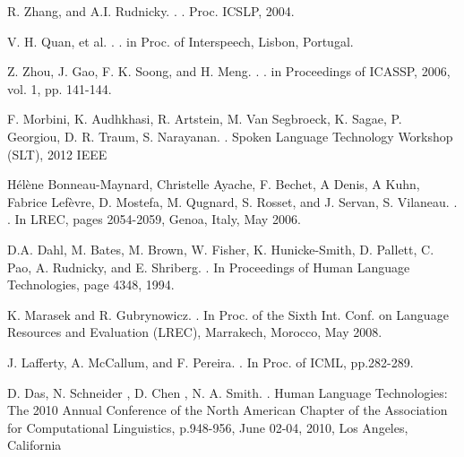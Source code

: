 \documentclass[11pt,letterpaper]{article}
\begin{document}
\begin{thebibliography}{}
R. Zhang, and A.I. Rudnicky.
. 
.
\newblock Proc. ICSLP, 2004. 

V. H. Quan, et al.
. 
.
\newblock in Proc. of Interspeech, Lisbon, Portugal.

Z. Zhou, J. Gao, F. K. Soong, and H. Meng.
. 
.
\newblock in Proceedings of ICASSP, 2006, vol. 1, pp. 141-144. 

F. Morbini, K. Audhkhasi, R. Artstein, M. Van Segbroeck, K. Sagae, P. Georgiou, D. R. Traum, S. Narayanan.
. 
\newblock Spoken Language Technology Workshop (SLT), 2012 IEEE

H\'{e}l\`{e}ne Bonneau-Maynard, Christelle Ayache, F. Bechet, A Denis, A Kuhn, Fabrice Lef\`{e}vre, D. Mostefa, M. Qugnard, S. Rosset, and J. Servan, S. Vilaneau. 
. 
.
\newblock In LREC, pages 2054-2059, Genoa, Italy, May 2006.

D.A. Dahl, M. Bates, M. Brown, W. Fisher, K. Hunicke-Smith, D. Pallett, C. Pao, A. Rudnicky, and E. Shriberg.
. 
\newblock In Proceedings of Human Language Technologies, page 4348, 1994.

K. Marasek and R. Gubrynowicz. 
. 
\newblock In Proc. of the Sixth Int. Conf. on Language Resources and Evaluation (LREC), Marrakech, Morocco, May 2008.

J. Lafferty, A. McCallum, and F. Pereira.
. 
\newblock In Proc. of ICML, pp.282-289.

D. Das, N. Schneider , D. Chen , N. A. Smith. 
. 
\newblock Human Language Technologies: The 2010 Annual Conference of the North American Chapter of the Association for Computational Linguistics, p.948-956, June 02-04, 2010, Los Angeles, California


\end{thebibliography}
\end{document}
